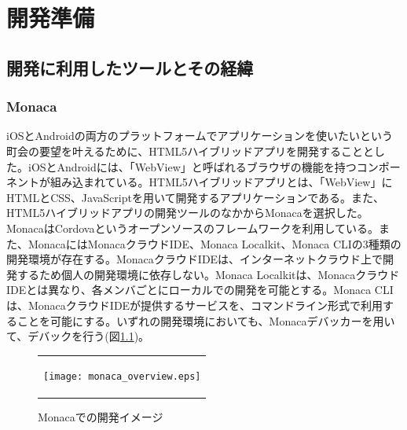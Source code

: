 \chapter{開発準備}

\section{開発に利用したツールとその経緯}%
\subsection{Monaca}%
iOSとAndroidの両方のプラットフォームでアプリケーションを使いたいという町会の要望を叶えるために、HTML5ハイブリッドアプリを開発することとした。iOSとAndroidには、「WebView」と呼ばれるブラウザの機能を持つコンポーネントが組み込まれている。HTML5ハイブリッドアプリとは、「WebView」にHTMLとCSS、JavaScriptを用いて開発するアプリケーションである。また、HTML5ハイブリッドアプリの開発ツールのなかからMonacaを選択した。MonacaはCordovaというオープンソースのフレームワークを利用している。また、MonacaにはMonacaクラウドIDE、Monaca Localkit、Monaca CLIの3種類の開発環境が存在する。MonacaクラウドIDEは、インターネットクラウド上で開発するため個人の開発環境に依存しない。Monaca Localkitは、MonacaクラウドIDEとは異なり、各メンバごとにローカルでの開発を可能とする。Monaca CLIは、MonacaクラウドIDEが提供するサービスを、コマンドライン形式で利用することを可能にする。いずれの開発環境においても、Monacaデバッカーを用いて、デバックを行う(図\ref{fig:image_monaca})。

\begin{figure}[h]
  \begin{center}
    \begin{tabular}{c}

      \begin{minipage}{0.7\hsize}
        \begin{center}
\texttt{[image: monaca\_overview.eps]}
          \hspace{1cm} %
        \end{center}
      \end{minipage}

    \end{tabular}
    \caption{Monacaでの開発イメージ}
    \label{fig:image_monaca}
  \end{center}
\end{figure}

